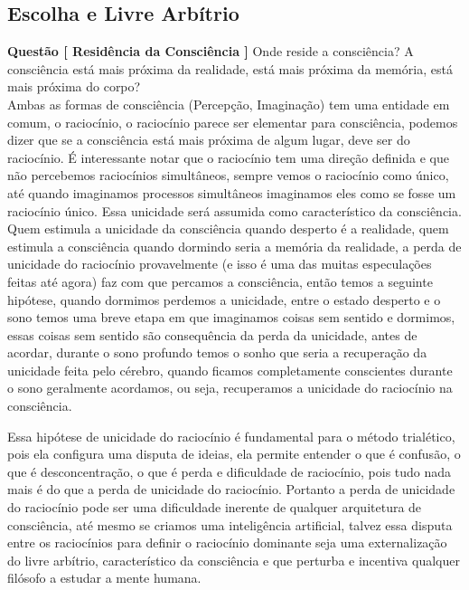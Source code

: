 \hspace{\baselineskip}

\subsection{Escolha e Livre Arbítrio}

\hspace{\baselineskip}

\textbf{Questão [ Residência da Consciência ]} Onde reside a consciência? A consciência está mais próxima da realidade, está mais próxima da memória, está mais próxima do corpo?\\

Ambas as formas de consciência (Percepção, Imaginação) tem uma entidade em comum, o raciocínio, o raciocínio parece ser elementar para consciência, podemos dizer que se a consciência está mais próxima de algum lugar, deve ser do raciocínio. É interessante notar que o raciocínio tem uma direção definida e que não percebemos raciocínios simultâneos, sempre vemos o raciocínio como único, até quando imaginamos processos simultâneos imaginamos eles como se fosse um raciocínio único. Essa unicidade será assumida como característico da consciência. Quem estimula a unicidade da consciência quando desperto é a realidade, quem estimula a consciência quando dormindo seria a memória da realidade, a perda de unicidade do raciocínio provavelmente (e isso é uma das muitas especulações feitas até agora) faz com que percamos a consciência, então temos a seguinte hipótese, quando dormimos perdemos a unicidade, entre o estado desperto e o sono temos uma breve etapa em que imaginamos coisas sem sentido e dormimos, essas coisas sem sentido são consequência da perda da unicidade, antes de acordar, durante o sono profundo temos o sonho que seria a recuperação da unicidade feita pelo cérebro, quando ficamos completamente conscientes durante o sono geralmente acordamos, ou seja, recuperamos a unicidade do raciocínio na consciência.

Essa hipótese de unicidade do raciocínio é fundamental para o método trialético, pois ela configura uma disputa de ideias, ela permite entender o que é confusão, o que é desconcentração, o que é perda e dificuldade de raciocínio, pois tudo nada mais é do que a perda de unicidade do raciocínio. Portanto a perda de unicidade do raciocínio pode ser uma dificuldade inerente de qualquer arquitetura de consciência, até mesmo se criamos uma inteligência artificial, talvez essa disputa entre os raciocínios para definir o raciocínio dominante seja uma externalização do livre arbítrio, característico da consciência e que perturba e incentiva qualquer filósofo a estudar a mente humana.\\

